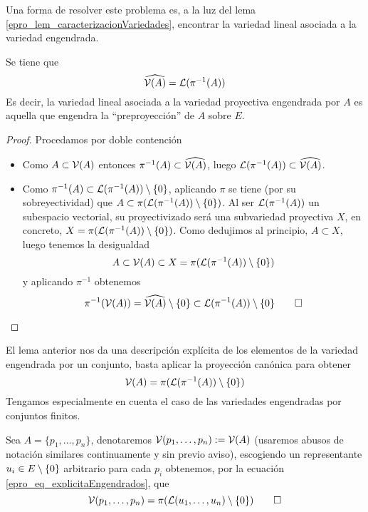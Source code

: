 Una forma de resolver este problema es, a la luz del lema \ref{epro_lem_caracterizacionVariedades}, encontrar la variedad lineal asociada a la variedad engendrada.
\begin{lem}
	Se tiene que \begin{equation*}
		\widehat{\mathcal{V}(A)}=\mathcal{L}(\pi^{-1}(A))
	\end{equation*}
	Es decir, la variedad lineal asociada a la variedad proyectiva engendrada por $A$ es aquella que engendra la ``preproyección'' de $A$ sobre $E$.
\end{lem}
\begin{proof}
	Procedamos por doble contención
	\begin{itemize}
		\item[\bsupset] Como $A\subset\mathcal{V}(A)$ entonces $\pi^{-1}(A)\subset\widehat{\mathcal{V}(A)}$, luego $\mathcal{L}(\pi^{-1}(A))\subset\widehat{\mathcal{V}(A)}$.
		\item[\bsubset]Como $\pi^{-1}(A)\subset\mathcal{L}(\pi^{-1}(A))\setminus\{0\}$, aplicando $\pi$ se tiene (por su sobreyectividad) que $A\subset \pi(\mathcal{L}(\pi^{-1}(A))\setminus\{0\})$. Al ser $\mathcal{L}(\pi^{-1}(A))$ un subespacio vectorial, su proyectivizado será una subvariedad proyectiva $X$, en concreto, $X=\pi(\mathcal{L}(\pi^{-1}(A))\setminus\{0\})$. Como dedujimos al principio, $A\subset X$, luego tenemos la desigualdad
		\begin{equation*}
			A\subset\mathcal{V}(A)\subset X=\pi(\mathcal{L}(\pi^{-1}(A))\setminus\{0\})
		\end{equation*}
		y aplicando $\pi^{-1}$ obtenemos
		\begin{equation*}
			\pi^{-1}(\mathcal{V}(A))=\widehat{\mathcal{V}(A)}\setminus\{0\}\subset\mathcal{L}(\pi^{-1}(A))\setminus\{0\}\qedhere
		\end{equation*}
	\end{itemize}
\end{proof}
El lema anterior nos da una descripción explícita de los elementos de la variedad engendrada por un conjunto, basta aplicar la proyección canónica para obtener
\begin{equation}
\label{epro_eq_explicitaEngendrados}
	\mathcal{V}(A)=\pi(\mathcal{L}(\pi^{-1}(A))\setminus\{0\})
\end{equation}
Tengamos especialmente en cuenta el caso de las variedades engendradas por conjuntos finitos.
\begin{exa}
	Sea $A=\{p_1,\dots,p_n\}$, denotaremos $\mathcal{V}(p_1,\dots,p_n):=\mathcal{V}(A)$ (usaremos abusos de notación similares continuamente y sin previo aviso), escogiendo un representante $u_i\in E\setminus\{0\}$ arbitrario para cada $p_i$ obtenemos, por la ecuación \eqref{epro_eq_explicitaEngendrados}, que
	\begin{equation*}
		\mathcal{V}(p_1,\dots,p_n)=\pi(\mathcal{L}(u_1,\dots,u_n)\setminus\{0\})\qedhere
	\end{equation*}
\end{exa}
